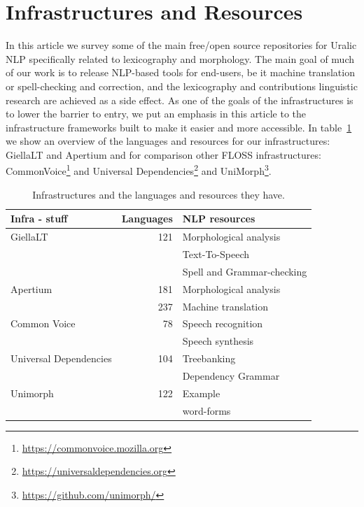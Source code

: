 \documentclass[free]{flammie}
\begin{document}
\section{Infrastructures and Resources} \label{sec:unfra}

In this article we survey some of the main free/open source repositories for Uralic NLP specifically related to lexicography and morphology.
The main goal of much of our work is to release NLP-based tools for end-users, be it machine translation or spell-checking and correction, and the lexicography and contributions linguistic research are achieved as a side effect.
As one of the goals of the infrastructures is to lower the barrier to entry, we put an emphasis in this article to the infrastructure frameworks built to make it easier and more accessible.
In table~\ref{table:infra} we show an overview of the languages and resources for our infrastructures: GiellaLT and Apertium and for comparison other FLOSS infrastructures: CommonVoice\footnote{\url{https://commonvoice.mozilla.org}} and Universal Dependencies\footnote{\url{https://universaldependencies.org}} and UniMorph\footnote{\url{https://github.com/unimorph/}}.


\begin{table}
\centering
\caption{Infrastructures and the languages and resources they have.\label{table:infra}}
\begin{tabular}{lrl}
\toprule
\textbf{Infra - stuff} & \textbf{Languages} & \textbf{NLP resources} \\
\midrule
GiellaLT &  121 & Morphological analysis\\
         &      & Text-To-Speech \\
         &      & Spell and Grammar-checking \\
Apertium &  181 & Morphological analysis \\
         &  237 & Machine translation \\
\midrule
Common Voice & 78 & Speech recognition \\
            &    & Speech synthesis \\
Universal Dependencies & 104 & Treebanking \\
  & & Dependency Grammar \\
Unimorph & 122 & Example \\
 & & word-forms \\
\bottomrule
\end{tabular}
\end{table}
\end{document}
